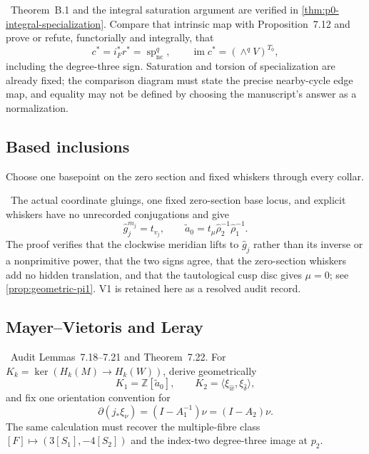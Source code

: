 \begin{obligation}
\Open\ Theorem~B.1 and the integral saturation argument are verified in
\cref{thm:p0-integral-specialization}.  Compare that intrinsic map with
Proposition~7.12 and prove or refute, functorially and integrally, that
\[
c^*=i_F^*r^*=\operatorname{sp}_{\mathrm{nc}}^q,
\qquad
\operatorname{im}c^*=(\wedge^qV)^{T_0},
\]
including the degree-three sign.  Saturation and torsion of specialization
are already fixed; the comparison diagram must state the precise nearby-cycle
edge map, and equality may not be defined by choosing the manuscript's answer
as a normalization.
\end{obligation}

\subsection{Based inclusions}

Choose one basepoint on the zero section and fixed whiskers through every collar.

\begin{obligation}
\Verified\ The actual coordinate gluings, one fixed zero-section base locus,
and explicit whiskers have no unrecorded conjugations and give
\[
\widehat g_j^{m_j}=t_{v_j},
\qquad
\widetilde a_0=t_\mu\widehat\rho_2^{-1}\widehat\rho_1^{-1}.
\]
The proof verifies that the clockwise meridian lifts to
$\widehat g_j$ rather than its inverse or a nonprimitive power, that the two
signs agree, that the zero-section whiskers add no hidden translation, and
that the tautological cusp disc gives $\mu=0$; see
\cref{prop:geometric-pi1}.  V1 is retained here as a resolved audit record.
\end{obligation}

\subsection{Mayer--Vietoris and Leray}

\begin{obligation}
\Open\ Audit Lemmas~7.18--7.21 and Theorem~7.22.  For
$K_k=\ker(H_k(M)\to H_k(W))$, derive geometrically
\[
K_1=\mathbb Z[\widetilde a_0],
\qquad
K_2=\langle\xi_{\widehat w},\xi_{\widehat\delta}\rangle,
\]
and fix one orientation convention for
\[
\partial(j_*\xi_\nu)=(I-A_1^{-1})\nu=(I-A_2)\nu.
\]
The same calculation must recover the multiple-fibre class
\([F]\longmapsto(3[S_1],-4[S_2])\) and the index-two degree-three image at $p_2$.
\end{obligation}

